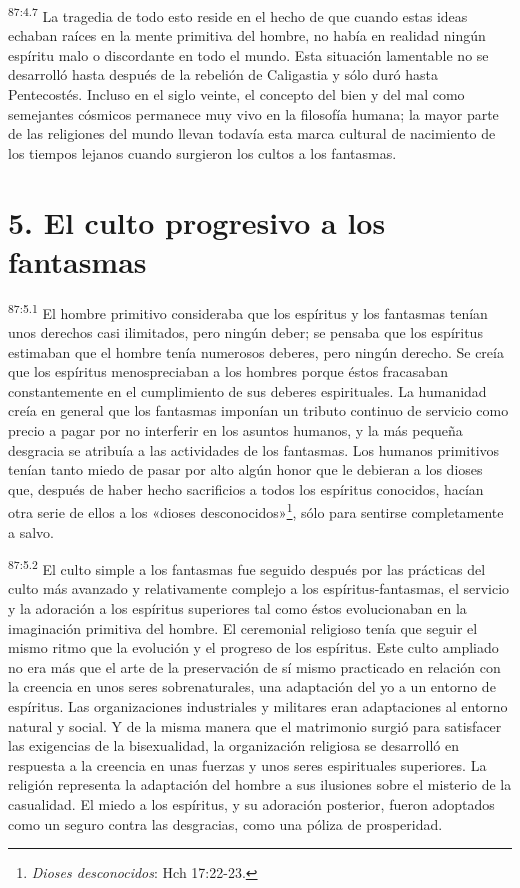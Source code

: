 \par
\textsuperscript{87:4.7} La tragedia de todo esto reside en el hecho de que cuando estas ideas echaban raíces en la mente primitiva del hombre, no había en realidad ningún espíritu malo o discordante en todo el mundo. Esta situación lamentable no se desarrolló hasta después de la rebelión de Caligastia y sólo duró hasta Pentecostés. Incluso en el siglo veinte, el concepto del bien y del mal como semejantes cósmicos permanece muy vivo en la filosofía humana; la mayor parte de las religiones del mundo llevan todavía esta marca cultural de nacimiento de los tiempos lejanos cuando surgieron los cultos a los fantasmas.

\section*{5. El culto progresivo a los fantasmas}
\par
\textsuperscript{87:5.1} El hombre primitivo consideraba que los espíritus y los fantasmas tenían unos derechos casi ilimitados, pero ningún deber; se pensaba que los espíritus estimaban que el hombre tenía numerosos deberes, pero ningún derecho. Se creía que los espíritus menospreciaban a los hombres porque éstos fracasaban constantemente en el cumplimiento de sus deberes espirituales. La humanidad creía en general que los fantasmas imponían un tributo continuo de servicio como precio a pagar por no interferir en los asuntos humanos, y la más pequeña desgracia se atribuía a las actividades de los fantasmas. Los humanos primitivos tenían tanto miedo de pasar por alto algún honor que le debieran a los dioses que, después de haber hecho sacrificios a todos los espíritus conocidos, hacían otra serie de ellos a los «dioses desconocidos»\footnote{\textit{Dioses desconocidos}: Hch 17:22-23.}, sólo para sentirse completamente a salvo.

\par
\textsuperscript{87:5.2} El culto simple a los fantasmas fue seguido después por las prácticas del culto más avanzado y relativamente complejo a los espíritus-fantasmas, el servicio y la adoración a los espíritus superiores tal como éstos evolucionaban en la imaginación primitiva del hombre. El ceremonial religioso tenía que seguir el mismo ritmo que la evolución y el progreso de los espíritus. Este culto ampliado no era más que el arte de la preservación de sí mismo practicado en relación con la creencia en unos seres sobrenaturales, una adaptación del yo a un entorno de espíritus. Las organizaciones industriales y militares eran adaptaciones al entorno natural y social. Y de la misma manera que el matrimonio surgió para satisfacer las exigencias de la bisexualidad, la organización religiosa se desarrolló en respuesta a la creencia en unas fuerzas y unos seres espirituales superiores. La religión representa la adaptación del hombre a sus ilusiones sobre el misterio de la casualidad. El miedo a los espíritus, y su adoración posterior, fueron adoptados como un seguro contra las desgracias, como una póliza de prosperidad.

